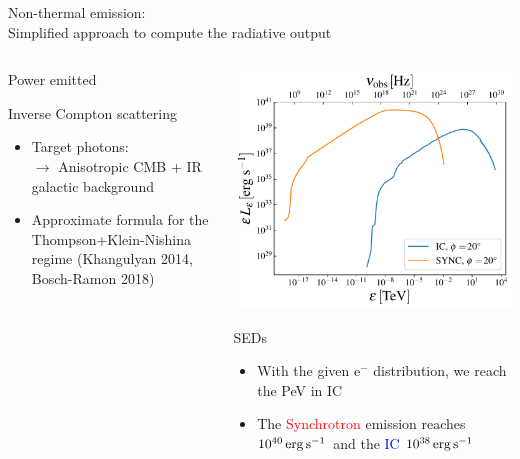 \begin{frame}{Non-thermal emission:\\
	Simplified approach to compute the radiative output}
\begin{columns}
{\begin{column}{.5\textwidth}
\begin{block}{Power emitted}
\begin{itemize}
				\end{itemize}
			\end{block}
			\begin{block}{Inverse Compton scattering}
			    \begin{itemize}
				    \item Target photons:\\
						$\rightarrow$ Anisotropic CMB + IR galactic background
					\item Approximate formula for the Thompson+Klein-Nishina regime
						(Khangulyan 2014, Bosch-Ramon 2018)
				\end{itemize}
			\end{block}
		\end{column}
		\begin{column}{.5\textwidth}
			\includegraphics[width=\linewidth]{images/eled_ic_sync_hr.pdf}
			\begin{exampleblock}{SEDs}
				\begin{itemize}
					\item With the given e$^{-}$ distribution, we reach the PeV in IC
					\item The \textcolor{red}{Synchrotron} emission reaches $10^{40}\,{\rm erg}\,{\rm s}^{-1}$
							and the \textcolor{blue}{IC}  $10^{38}\,{\rm erg}\,{\rm s}^{-1}$
				\end{itemize}
			\end{exampleblock}
			\centering
		\end{column}
		}
	\end{columns}
\end{frame}

